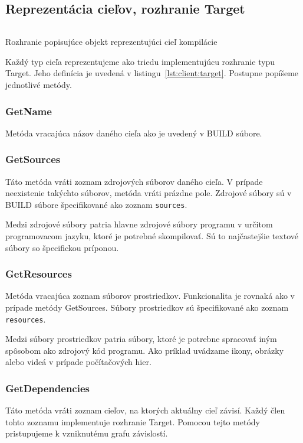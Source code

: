 \subsection{Reprezentácia cieľov, rozhranie Target}
\label{sec:master:target}

\begin{listing}[H]
  \inputminted[frame=lines,framesep=2mm,linenos,fontsize=\scriptsize,firstline=8,lastline=14]{go}{/home/pepol/src/imterra/forge/client/target/target.go}
  \caption[Rozhranie Target]{Rozhranie popisujúce objekt reprezentujúci cieľ kompilácie}
  \label{lst:client:target}
\end{listing}

Každý typ cieľa reprezentujeme ako triedu implementujúcu rozhranie typu Target.
Jeho definícia je uvedená v listingu~\ref{lst:client:target}. Postupne popíšeme
jednotlivé metódy.

\subsubsection{GetName}
Metóda vracajúca názov daného cieľa ako je uvedený v BUILD súbore.

\subsubsection{GetSources}
Táto metóda vráti zoznam zdrojových súborov daného cieľa. V prípade neexistenie
takýchto súborov, metóda vráti prázdne pole. Zdrojové súbory sú v BUILD súbore
špecifikované ako zoznam \texttt{sources}.

Medzi zdrojové súbory patria hlavne zdrojové súbory programu v určitom
programovacom jazyku, ktoré je potrebné skompilovať. Sú to najčastejšie textové
súbory so špecifickou príponou.

\subsubsection{GetResources}
Metóda vracajúca zoznam súborov prostriedkov. Funkcionalita je rovnaká ako v
prípade metódy GetSources. Súbory prostriedkov sú špecifikované ako zoznam
\texttt{resources}.

Medzi súbory prostriedkov patria súbory, ktoré je potrebne spracovať iným spôsobom
ako zdrojový kód programu. Ako príklad uvádzame ikony, obrázky alebo videá v
prípade počítačových hier.

\subsubsection{GetDependencies}
Táto metóda vráti zoznam cieľov, na ktorých aktuálny cieľ závisí. Každý člen
tohto zoznamu implementuje rozhranie Target. Pomocou tejto metódy pristupujeme
k vzniknutému grafu závislostí.

